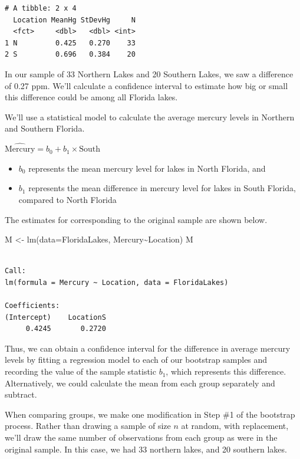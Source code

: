 \documentclass[
  letterpaper,
  DIV=11,
  numbers=noendperiod]{scrreprt}
\newenvironment{Shaded}{\begin{snugshade}}{\end{snugshade}}
\newcommand{\AttributeTok}[1]{\textcolor[rgb]{0.40,0.45,0.13}{#1}}
\newcommand{\FunctionTok}[1]{\textcolor[rgb]{0.28,0.35,0.67}{#1}}
\newcommand{\NormalTok}[1]{\textcolor[rgb]{0.00,0.23,0.31}{#1}}
\newcommand{\OtherTok}[1]{\textcolor[rgb]{0.00,0.23,0.31}{#1}}
\newcommand{\SpecialCharTok}[1]{\textcolor[rgb]{0.37,0.37,0.37}{#1}}
\providecommand{\tightlist}{%
  \setlength{\itemsep}{0pt}\setlength{\parskip}{0pt}}\usepackage{longtable,booktabs,array}
\begin{document}
\begin{verbatim}
# A tibble: 2 x 4
  Location MeanHg StDevHg     N
  <fct>     <dbl>   <dbl> <int>
1 N         0.425   0.270    33
2 S         0.696   0.384    20
\end{verbatim}

In our sample of 33 Northern Lakes and 20 Southern Lakes, we saw a
difference of 0.27 ppm. We'll calculate a confidence interval to
estimate how big or small this difference could be among all Florida
lakes.

We'll use a statistical model to calculate the average mercury levels in
Northern and Southern Florida.

\(\widehat{\text{Mercury}} = b_0 +b_1\times{\text{South}}\)

\begin{itemize}
\tightlist
\item
  \(b_0\) represents the mean mercury level for lakes in North Florida,
  and\\
\item
  \(b_1\) represents the mean difference in mercury level for lakes in
  South Florida, compared to North Florida
\end{itemize}

The estimates for corresponding to the original sample are shown below.

\begin{Shaded}
\begin{Highlighting}[]
\NormalTok{M }\OtherTok{\textless{}{-}} \FunctionTok{lm}\NormalTok{(}\AttributeTok{data=}\NormalTok{FloridaLakes, Mercury}\SpecialCharTok{\textasciitilde{}}\NormalTok{Location)}
\NormalTok{M}
\end{Highlighting}
\end{Shaded}

\begin{verbatim}

Call:
lm(formula = Mercury ~ Location, data = FloridaLakes)

Coefficients:
(Intercept)    LocationS  
     0.4245       0.2720  
\end{verbatim}

Thus, we can obtain a confidence interval for the difference in average
mercury levels by fitting a regression model to each of our bootstrap
samples and recording the value of the sample statistic \(b_1\), which
represents this difference. Alternatively, we could calculate the mean
from each group separately and subtract.

When comparing groups, we make one modification in Step \#1 of the
bootstrap process. Rather than drawing a sample of size \(n\) at random,
with replacement, we'll draw the same number of observations from each
group as were in the original sample. In this case, we had 33 northern
lakes, and 20 southern lakes.
\end{document}
